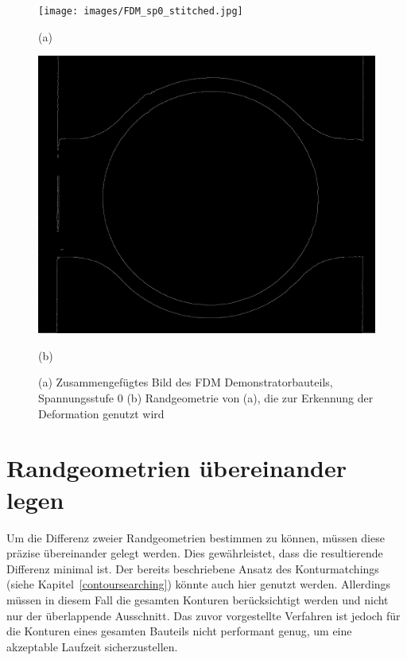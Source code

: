\begin{figure}[H]
    \centering
    \begin{minipage}{0.49\textwidth}
        \centering
        \texttt{[image: images/FDM\_sp0\_stitched.jpg]} %
        \caption*{(a)} 
    \end{minipage}\hfill
    \begin{minipage}{0.49\textwidth}
        \centering
        \includegraphics[width=\textwidth]{images/contours_FDM_sp0_stitched.jpg} %
        \caption*{(b)}
    \end{minipage}\hfill
    \caption{(a) Zusammengefügtes Bild des FDM Demonstratorbauteils, Spannungsstufe 0
    (b) Randgeometrie von (a), die zur Erkennung der Deformation genutzt wird}
        \label{fig:stichted_contour}
\end{figure}

\section{Randgeometrien übereinander legen}

Um die Differenz zweier Randgeometrien bestimmen zu können, 
müssen diese präzise übereinander gelegt werden. Dies gewährleistet, 
dass die resultierende Differenz minimal ist. Der bereits beschriebene Ansatz 
des Konturmatchings (siehe Kapitel~\ref{contoursearching}) könnte auch hier genutzt werden. Allerdings 
müssen in diesem Fall die gesamten Konturen berücksichtigt werden und nicht 
nur der überlappende Ausschnitt. Das zuvor vorgestellte Verfahren ist jedoch 
für die Konturen eines gesamten Bauteils nicht performant genug, um eine 
akzeptable Laufzeit sicherzustellen.

